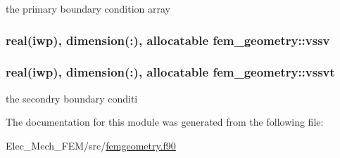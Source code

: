 the primary boundary condition array 

\hypertarget{classfem__geometry_a4e7c22284b2c19f02a5b9abe1fd64cb0}{}
\subsubsection[{vssv}]{\setlength{\rightskip}{0pt plus 5cm}real(iwp), dimension(\+:), allocatable fem\+\_\+geometry\+::vssv}\label{classfem__geometry_a4e7c22284b2c19f02a5b9abe1fd64cb0}
\hypertarget{classfem__geometry_a01643bdf277beb80ca579a4f1f45b179}{}
\subsubsection[{vssvt}]{\setlength{\rightskip}{0pt plus 5cm}real(iwp), dimension(\+:), allocatable fem\+\_\+geometry\+::vssvt}\label{classfem__geometry_a01643bdf277beb80ca579a4f1f45b179}


the secondry boundary conditi 



The documentation for this module was generated from the following file\+:\begin{DoxyCompactItemize}
\item 
Elec\+\_\+\+Mech\+\_\+\+F\+E\+M/src/\hyperlink{femgeometry_8f90}{femgeometry.\+f90}\end{DoxyCompactItemize}
